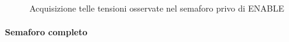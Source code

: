 \documentclass[a4paper,11pt]{article}
\begin{document}
\begin{figure}[h]
{		}\\
\caption{Acquisizione telle tensioni osservate nel semaforo privo di ENABLE}
\label{fig:acq}
\end{figure}
\paragraph{Semaforo completo}
	
\end{document}
